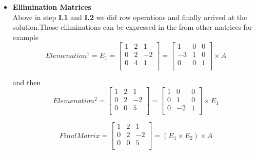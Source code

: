 \documentclass[a4paper,11pt]{article}
\numberwithin{equation}{section}
\begin{document}
\begin{itemize}
        \item \textbf{Ellimination Matrices}
        \vspace{5pt}\\
        Above in step \textbf{I.1} and \textbf{I.2} we did row operations and finally arrived at the solution.Those elliminations can be expressed in the from other matrices for example\\
        \begin{equation}
            Elemenation^1=E_1=
            \begin{bmatrix}
                1 & 2 & 1 \\
                0 & 2 & -2 \\
                0 & 4 & 1 \\
            \end{bmatrix}=
            \begin{bmatrix}
                1 & 0 & 0 \\
                -3 & 1 & 0 \\
                0 & 0 & 1 \\
            \end{bmatrix} \times A
        \end{equation}

        and then \\
        \begin{equation}
            Elemenation^2=
            \begin{bmatrix}
                1 & 2 & 1 \\
                0 & 2 & -2 \\
                0 & 0 & 5 \\
            \end{bmatrix}=
            \begin{bmatrix}
                1 & 0 & 0 \\
                0 & 1 & 0 \\
                0 & -2 & 1 \\
            \end{bmatrix} \times E_1
        \end{equation}

        \begin{equation}
            Final Matrix=
            \begin{bmatrix}
                1 & 2 & 1 \\
                0 & 2 & -2 \\
                0 & 0 & 5 \\
            \end{bmatrix}=
            (E_1 \times E_2) \times A
        \end{equation}


\end{itemize}
\end{document}
